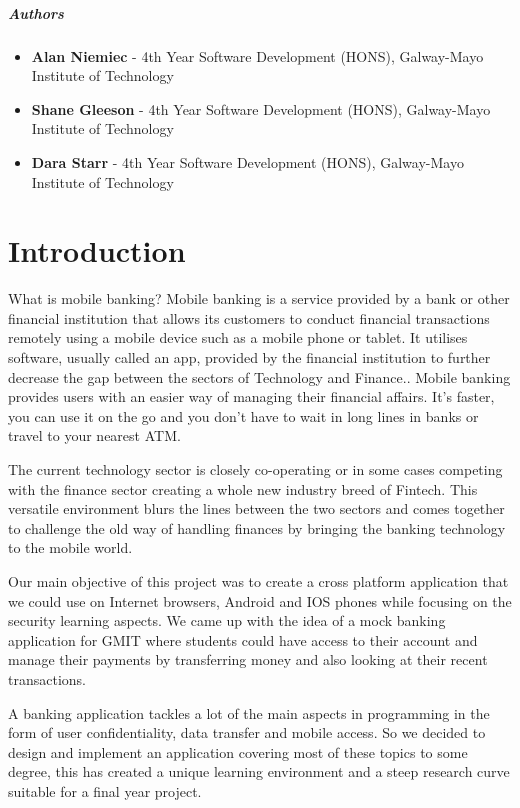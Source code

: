 \paragraph{Authors}
    \begin{itemize}
    \item \textbf{Alan Niemiec} - 4th Year Software Development (HONS), Galway-Mayo Institute of Technology
    \item \textbf{Shane Gleeson} - 4th Year Software Development (HONS), Galway-Mayo Institute of Technology 
    \item \textbf{Dara Starr} - 4th Year Software Development (HONS), Galway-Mayo Institute of Technology
    \end{itemize}



\chapter{Introduction}
What is mobile banking? Mobile banking is a service provided by a bank or other financial institution that allows its customers to conduct financial transactions remotely using a mobile device such as a mobile phone or tablet\cite{mobilebankingwiki}. It utilises software, usually called an app, provided by the financial institution to further decrease the gap between the sectors of Technology and Finance.\cite{mobilebankingwiki}. Mobile banking provides users with an easier way of managing their financial affairs. It's faster, you can use it on the go and you don't have to wait in long lines in banks or travel to your nearest ATM.

The current technology sector is closely co-operating or in some cases competing with the finance sector creating a whole new industry breed of Fintech. This versatile environment blurs the lines between the two sectors and comes together to challenge the old way of handling finances by bringing the banking technology to the mobile world.\cite{fintech}

Our main objective of this project was to create a cross platform application that we could use on Internet browsers, Android and IOS phones while focusing on the security learning aspects. We came up with the idea of a mock banking application for GMIT where students could have access to their account and manage their payments by transferring money and also looking at their recent transactions. 

A banking application tackles a lot of the main aspects in programming in the form of user confidentiality, data transfer and mobile access. So we decided to design and implement an application covering most of these topics to some degree, this has created a unique learning environment and a steep research curve suitable for a final year project.

